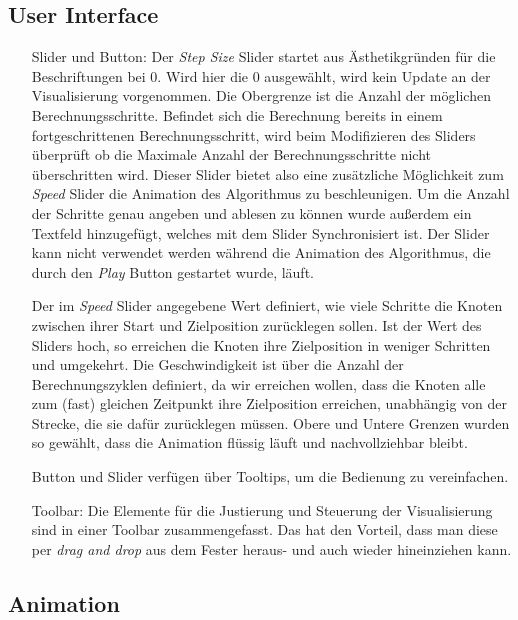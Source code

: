 \subsection*{User Interface}
\begin{enumerate}
    \item[Slider und Button:] Der \textit{Step Size} Slider startet aus Ästhetikgründen für die Beschriftungen bei 0. Wird hier die 0 ausgewählt, wird kein Update an der Visualisierung vorgenommen. Die Obergrenze ist die Anzahl der möglichen  Berechnungsschritte. Befindet sich die Berechnung bereits in einem fortgeschrittenen Berechnungsschritt, wird beim Modifizieren des Sliders überprüft ob die Maximale Anzahl der Berechnungsschritte nicht überschritten wird. Dieser Slider bietet also eine zusätzliche Möglichkeit zum \textit{Speed} Slider die Animation des Algorithmus zu beschleunigen. Um die Anzahl der Schritte genau angeben und ablesen zu können wurde außerdem ein Textfeld hinzugefügt, welches mit dem Slider Synchronisiert ist. Der Slider kann nicht verwendet werden während die Animation des Algorithmus, die durch den \textit{Play} Button gestartet wurde, läuft. 
    
    Der im \textit{Speed} Slider angegebene Wert definiert, wie viele Schritte die Knoten zwischen ihrer Start und Zielposition zurücklegen sollen. Ist der Wert des Sliders hoch, so erreichen die Knoten ihre Zielposition in weniger Schritten und umgekehrt. Die Geschwindigkeit ist über die Anzahl der Berechnungszyklen definiert, da wir erreichen wollen, dass die  Knoten alle zum (fast) gleichen Zeitpunkt ihre Zielposition erreichen, unabhängig von der Strecke, die sie dafür zurücklegen müssen. Obere und Untere Grenzen wurden so gewählt, dass die Animation flüssig läuft und nachvollziehbar bleibt.
    
    Button und Slider verfügen über Tooltips, um die Bedienung zu vereinfachen.
    
    \item[Toolbar:] Die Elemente für die Justierung und Steuerung der Visualisierung sind in einer Toolbar zusammengefasst. Das hat den Vorteil, dass man diese per \textit{drag and drop} aus dem Fester heraus- und auch wieder hineinziehen kann.
    
\end{enumerate}

\subsection*{Animation}



